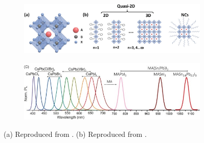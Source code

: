 \begin{figure}[htbp]
    \centering
    \begin{subfigure}[b]{\textwidth}
    \centering
        \includegraphics[width=0.85\linewidth]{chapters/introduction/image/perovskite_structure.jpg}
        \caption{}
        \label{fig:ch1:perovskite structure}
    \end{subfigure}

    \vspace{0.5cm}
    
    \begin{subfigure}[b]{\textwidth}
    \centering
        \includegraphics[width=0.85\linewidth]{chapters/introduction/image/bandgap_tunability.jpg}
        \caption{}
        \label{fig:ch1:bandgap_tunability}
    \end{subfigure}
    
    \caption{(a) Reproduced from \cite{Lei2021MetalApplications}. (b) Reproduced from \cite{Gholipour2020BandgapMaterials}.}
    \label{fig:ch1:perovskite_strucutre_bandgap}
\end{figure}



